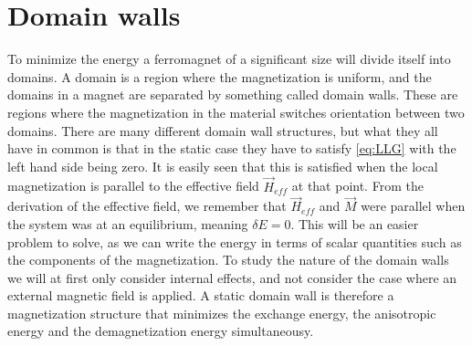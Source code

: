 \documentclass[12pt, a4paper, twoside, openright]{article}		%
\let\oldsection\section
\def\section{\cleardoublepage\oldsection}
\numberwithin{equation}{section}
\begin{document}
\section{Domain walls} \label{sec:DW}
To minimize the energy a ferromagnet of a significant size will divide itself into domains. A domain is a region where the magnetization is uniform, and the domains in a magnet are separated by something called domain walls. These are regions where the magnetization in the material switches orientation between two domains. There are many different domain wall structures, but what they all have in common is that in the static case they have to satisfy \eqref{eq:LLG} with the left hand side being zero. It is easily seen that this is satisfied when the local magnetization is parallel to the effective field $\vec{H}_{eff}$ at that point. From the derivation of the effective field, we remember that $\vec{H}_{eff}$ and $\vec{M}$ were parallel when the system was at an equilibrium, meaning $\delta E = 0$. This will be an easier problem to solve, as we can write the energy in terms of scalar quantities such as the components of the magnetization. To study the nature of the domain walls we will at first only consider internal effects, and not consider the case where an external magnetic field is applied. A static domain wall is therefore a magnetization structure that minimizes the exchange energy, the anisotropic energy and the demagnetization energy simultaneousy.
\end{document}
